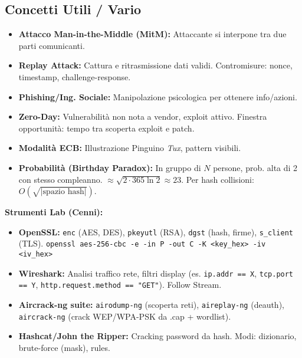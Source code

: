 \documentclass[10pt,a4paper]{article}
\begin{document}
\begin{multicols}{2}
\section*{Concetti Utili / Vario}
\begin{itemize}
    \item \textbf{Attacco Man-in-the-Middle (MitM):} Attaccante si interpone tra due parti comunicanti.
    \item \textbf{Replay Attack:} Cattura e ritrasmissione dati validi. Contromisure: nonce, timestamp, challenge-response.
    \item \textbf{Phishing/Ing. Sociale:} Manipolazione psicologica per ottenere info/azioni.
    \item \textbf{Zero-Day:} Vulnerabilità non nota a vendor, exploit attivo. Finestra opportunità: tempo tra scoperta exploit e patch.
    \item \textbf{Modalità ECB:} Illustrazione Pinguino \textit{Tux}, pattern visibili.
    \item \textbf{Probabilità (Birthday Paradox):} In gruppo di $N$ persone, prob. alta di 2 con stesso compleanno. $\approx \sqrt{2 \cdot 365 \ln 2} \approx 23$. Per hash collisioni: $O(\sqrt{|\text{spazio hash}|})$.
\end{itemize}

\textbf{Strumenti Lab (Cenni):}
\begin{itemize}
    \item \textbf{OpenSSL:} \texttt{enc} (AES, DES), \texttt{pkeyutl} (RSA), \texttt{dgst} (hash, firme), \texttt{s\_client} (TLS).
    \texttt{openssl aes-256-cbc -e -in P -out C -K <key\_hex> -iv <iv\_hex>}
    \item \textbf{Wireshark:} Analisi traffico rete, filtri display (es. \texttt{ip.addr == X}, \texttt{tcp.port == Y}, \texttt{http.request.method == "GET"}). Follow Stream.
    \item \textbf{Aircrack-ng suite:} \texttt{airodump-ng} (scoperta reti), \texttt{aireplay-ng} (deauth), \texttt{aircrack-ng} (crack WEP/WPA-PSK da .cap + wordlist).
    \item \textbf{Hashcat/John the Ripper:} Cracking password da hash. Modi: dizionario, brute-force (mask), rules.
\end{itemize}

\end{multicols}
\end{document}
